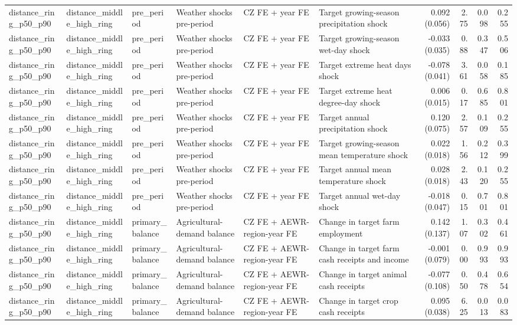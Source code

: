 \begin{tabular}{llllllrrrr}
distance_ring_p50_p90 & distance_middle_high_ring & pre_period & Weather shocks pre-period & CZ FE + year FE & Target growing-season precipitation shock & 0.092 (0.056) & 2.75 & 0.098 & 0.255 \\
distance_ring_p50_p90 & distance_middle_high_ring & pre_period & Weather shocks pre-period & CZ FE + year FE & Target growing-season wet-day shock & -0.033 (0.035) & 0.88 & 0.347 & 0.506 \\
distance_ring_p50_p90 & distance_middle_high_ring & pre_period & Weather shocks pre-period & CZ FE + year FE & Target extreme heat days shock & -0.078 (0.041) & 3.61 & 0.058 & 0.185 \\
distance_ring_p50_p90 & distance_middle_high_ring & pre_period & Weather shocks pre-period & CZ FE + year FE & Target extreme heat degree-day shock & 0.006 (0.015) & 0.17 & 0.685 & 0.801 \\
distance_ring_p50_p90 & distance_middle_high_ring & pre_period & Weather shocks pre-period & CZ FE + year FE & Target annual precipitation shock & 0.120 (0.075) & 2.57 & 0.109 & 0.255 \\
distance_ring_p50_p90 & distance_middle_high_ring & pre_period & Weather shocks pre-period & CZ FE + year FE & Target growing-season mean temperature shock & 0.022 (0.018) & 1.56 & 0.212 & 0.399 \\
distance_ring_p50_p90 & distance_middle_high_ring & pre_period & Weather shocks pre-period & CZ FE + year FE & Target annual mean temperature shock & 0.028 (0.018) & 2.43 & 0.120 & 0.255 \\
distance_ring_p50_p90 & distance_middle_high_ring & pre_period & Weather shocks pre-period & CZ FE + year FE & Target annual wet-day shock & -0.018 (0.047) & 0.15 & 0.701 & 0.801 \\
distance_ring_p50_p90 & distance_middle_high_ring & primary_balance & Agricultural-demand balance & CZ FE + AEWR-region-year FE & Change in target farm employment & 0.142 (0.137) & 1.07 & 0.302 & 0.461 \\
distance_ring_p50_p90 & distance_middle_high_ring & primary_balance & Agricultural-demand balance & CZ FE + AEWR-region-year FE & Change in target farm cash receipts and income & -0.001 (0.079) & 0.00 & 0.993 & 0.993 \\
distance_ring_p50_p90 & distance_middle_high_ring & primary_balance & Agricultural-demand balance & CZ FE + AEWR-region-year FE & Change in target animal cash receipts & -0.077 (0.108) & 0.50 & 0.478 & 0.654 \\
distance_ring_p50_p90 & distance_middle_high_ring & primary_balance & Agricultural-demand balance & CZ FE + AEWR-region-year FE & Change in target crop cash receipts & 0.095 (0.038) & 6.25 & 0.013 & 0.083 \\

\end{tabular}
